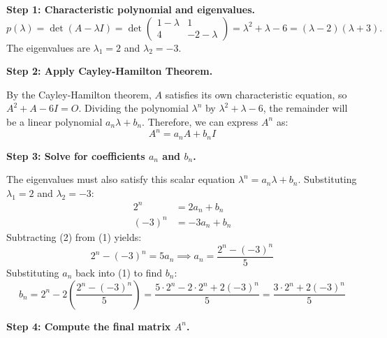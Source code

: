 \documentclass[12pt,a3paper]{article}
\begin{document}
\begin{tcolorbox}[enhanced,breakable,
  colback=cE!4,colframe=cE,boxrule=0.8pt,arc=5pt,
  title={\textbf{Answer --- $A^n$ via Cayley-Hamilton for $A=\begin{pmatrix}1&1\\4&-2\end{pmatrix}$}},
  fonttitle=\bfseries\color{white},colbacktitle=cE]

\textbf{Step 1: Characteristic polynomial and eigenvalues.}
\[
p(\lambda)=\det(A-\lambda I)=\det\begin{pmatrix}1-\lambda&1\\4&-2-\lambda\end{pmatrix} = \lambda^2+\lambda-6=(\lambda-2)(\lambda+3).
\]
The eigenvalues are $\lambda_1=2$ and $\lambda_2=-3$.

\medskip
\textbf{Step 2: Apply Cayley-Hamilton Theorem.}

By the Cayley-Hamilton theorem, $A$ satisfies its own characteristic equation, so $A^2 + A - 6I = O$. 
Dividing the polynomial $\lambda^n$ by $\lambda^2+\lambda-6$, the remainder will be a linear polynomial $a_n\lambda + b_n$. Therefore, we can express $A^n$ as:
\[
A^n = a_n A + b_n I
\]

\textbf{Step 3: Solve for coefficients $a_n$ and $b_n$.}

The eigenvalues must also satisfy this scalar equation $\lambda^n = a_n\lambda + b_n$. Substituting $\lambda_1 = 2$ and $\lambda_2 = -3$:
\begin{align}
2^n &= 2a_n + b_n \\
(-3)^n &= -3a_n + b_n
\end{align}
Subtracting (2) from (1) yields:
\[
2^n - (-3)^n = 5a_n \implies a_n = \frac{2^n - (-3)^n}{5}
\]
Substituting $a_n$ back into (1) to find $b_n$:
\[
b_n = 2^n - 2\left(\frac{2^n - (-3)^n}{5}\right) = \frac{5 \cdot 2^n - 2 \cdot 2^n + 2(-3)^n}{5} = \frac{3 \cdot 2^n + 2(-3)^n}{5}
\]

\textbf{Step 4: Compute the final matrix $A^n$.}


\end{tcolorbox}
\end{document}
